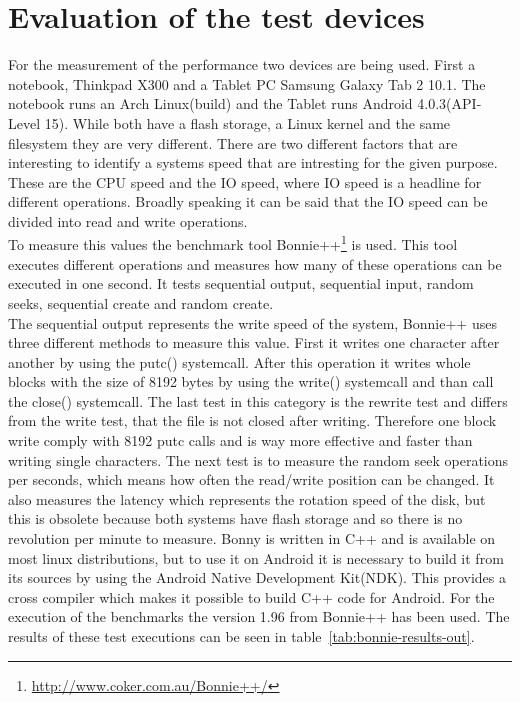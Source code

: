 \section{Evaluation of the test devices}
\label{sec:evaluation-of-the-test-devices}
For the measurement of the performance two devices are being used. 
First a notebook, Thinkpad X300 and a Tablet PC Samsung Galaxy Tab 2 10.1.
The notebook runs an Arch Linux(build) and the Tablet runs Android 4.0.3(API-Level 15).
While both have a flash storage, a Linux kernel and the same filesystem they are very different.%
There are two different factors that are interesting to identify a systems speed that are intresting for the given purpose.
These are the CPU speed and the IO speed, where IO speed is a headline for different operations.
Broadly speaking it can be said that the IO speed can be divided into read and write operations.\\
To measure this values the benchmark tool Bonnie++\footnote{\url{http://www.coker.com.au/Bonnie++/}} is used.
This tool executes different operations and measures how many of these operations can be executed in one second.
It tests sequential output, sequential input, random seeks, sequential create and random create.\\
The sequential output represents the write speed of the system, Bonnie++ uses three different methods to measure this value.
First it writes one character after another by using the putc() systemcall. 
After this operation it writes whole blocks with the size of 8192 bytes by using the write() systemcall and than call the close() systemcall.
The last test in this category is the rewrite test and differs from the write test, that the file is not closed after writing.
Therefore one block write comply with 8192 putc calls and is way more effective and faster than writing single characters.
The next test is to measure the random seek operations per seconds, which means how often the read/write position can be changed.
It also measures the latency which represents the rotation speed of the disk, but this is obsolete because both systems have flash storage and so there is no revolution per minute to measure.
Bonny is written in C++ and is available on most linux distributions, but to use it on Android it is necessary to build it from its sources by using the Android Native Development Kit(NDK).
This provides a cross compiler which makes it possible to build C++ code for Android.
For the execution of the benchmarks the version 1.96 from Bonnie++ has been used.
The results of these test executions can be seen in table~\ref{tab:bonnie-results-out}.
